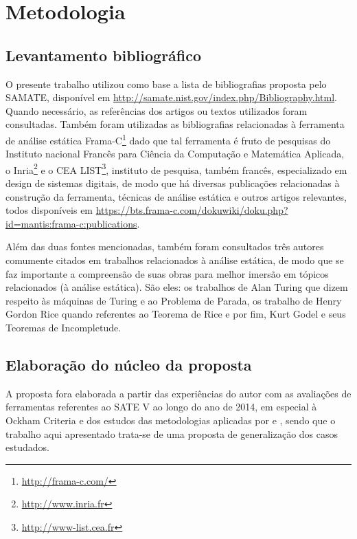 \chapter{Metodologia}\label{metodologia}

\section{Levantamento bibliográfico}

O presente trabalho utilizou como base  a lista de bibliografias proposta pelo SAMATE, disponível em \url{http://samate.nist.gov/index.php/Bibliography.html}. Quando necessário, as referências dos artigos ou textos utilizados foram consultadas. Também foram utilizadas as bibliografias relacionadas à ferramenta de análise estática Frama-C\footnote{\url{http://frama-c.com/}} dado que tal ferramenta é fruto de pesquisas do Instituto nacional Francês para Ciência da Computação e Matemática Aplicada, o Inria\footnote{\url{http://www.inria.fr}} e o CEA LIST\footnote{\url{http://www-list.cea.fr}}, instituto de pesquisa, também francês, especializado em design de sistemas digitais, de modo que há diversas publicações relacionadas à construção da ferramenta, técnicas de análise estática e outros artigos relevantes, todos disponíveis em \url{https://bts.frama-c.com/dokuwiki/doku.php?id=mantis:frama-c:publications}.

Além das duas fontes mencionadas, também foram consultados três autores comumente citados em trabalhos relacionados à análise estática, de modo que se faz importante a compreensão de suas obras para melhor imersão em tópicos relacionados (à análise estática). São eles: os trabalhos de Alan Turing que dizem respeito às máquinas de Turing e ao Problema de Parada, os trabalho de Henry Gordon Rice quando referentes ao Teorema de Rice e por fim, Kurt Godel e seus Teoremas de Incompletude.

\section{Elaboração do núcleo da proposta}

A proposta fora elaborada a partir das experiências do autor com as avaliações de ferramentas referentes ao SATE V ao longo do ano de 2014, em especial à Ockham Criteria e dos estudos das metodologias aplicadas por \cite{harvard} e \cite{nsa}, sendo que o trabalho aqui apresentado trata-se de uma proposta de generalização dos casos estudados.

